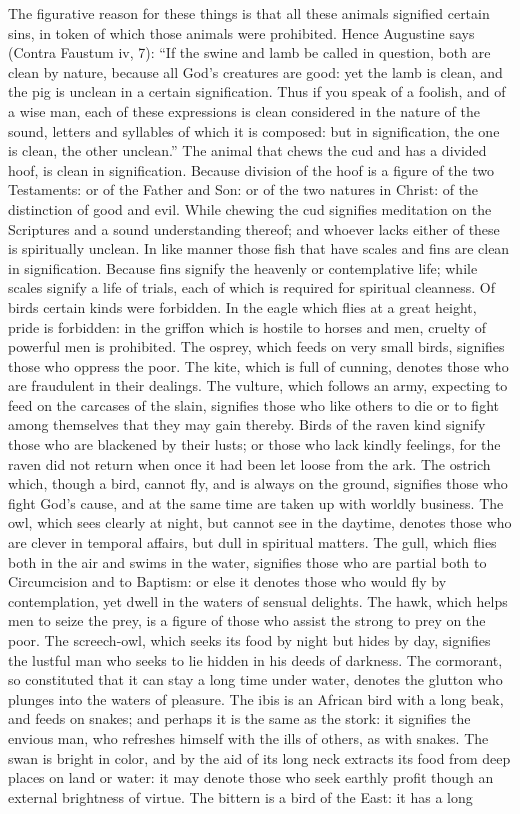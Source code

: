 The figurative reason for these things is that all these animals signified certain sins, in token of which those animals were prohibited. Hence Augustine says (Contra Faustum iv, 7): ``If the swine and lamb be called in question, both are clean by nature, because all God's creatures are good: yet the lamb is clean, and the pig is unclean in a certain signification. Thus if you speak of a foolish, and of a wise man, each of these expressions is clean considered in the nature of the sound, letters and syllables of which it is composed: but in signification, the one is clean, the other unclean.'' The animal that chews the cud and has a divided hoof, is clean in signification. Because division of the hoof is a figure of the two Testaments: or of the Father and Son: or of the two natures in Christ: of the distinction of good and evil. While chewing the cud signifies meditation on the Scriptures and a sound understanding thereof; and whoever lacks either of these is spiritually unclean. In like manner those fish that have scales and fins are clean in signification. Because fins signify the heavenly or contemplative life; while scales signify a life of trials, each of which is required for spiritual cleanness. Of birds certain kinds were forbidden. In the eagle which flies at a great height, pride is forbidden: in the griffon which is hostile to horses and men, cruelty of powerful men is prohibited. The osprey, which feeds on very small birds, signifies those who oppress the poor. The kite, which is full of cunning, denotes those who are fraudulent in their dealings. The vulture, which follows an army, expecting to feed on the carcases of the slain, signifies those who like others to die or to fight among themselves that they may gain thereby. Birds of the raven kind signify those who are blackened by their lusts; or those who lack kindly feelings, for the raven did not return when once it had been let loose from the ark. The ostrich which, though a bird, cannot fly, and is always on the ground, signifies those who fight God's cause, and at the same time are taken up with worldly business. The owl, which sees clearly at night, but cannot see in the daytime, denotes those who are clever in temporal affairs, but dull in spiritual matters. The gull, which flies both in the air and swims in the water, signifies those who are partial both to Circumcision and to Baptism: or else it denotes those who would fly by contemplation, yet dwell in the waters of sensual delights. The hawk, which helps men to seize the prey, is a figure of those who assist the strong to prey on the poor. The screech-owl, which seeks its food by night but hides by day, signifies the lustful man who seeks to lie hidden in his deeds of darkness. The cormorant, so constituted that it can stay a long time under water, denotes the glutton who plunges into the waters of pleasure. The ibis is an African bird with a long beak, and feeds on snakes; and perhaps it is the same as the stork: it signifies the envious man, who refreshes himself with the ills of others, as with snakes. The swan is bright in color, and by the aid of its long neck extracts its food from deep places on land or water: it may denote those who seek earthly profit though an external brightness of virtue. The bittern is a bird of the East: it has a long 